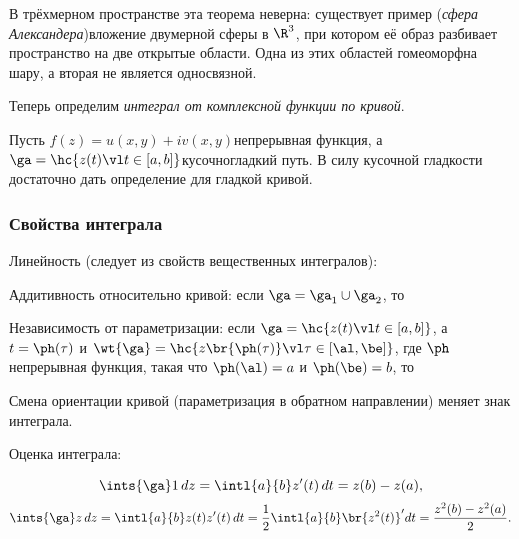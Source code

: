 \documentclass[a4paper]{article}
\begin{document}
\begin{note}
В трёхмерном пространстве эта теорема неверна: существует пример (\emph{сфера Александера})\т вложение
двумерной сферы в $\R^3$, при котором её образ разбивает пространство на две  открытые области. Одна из этих областей
гомеоморфна шару, а вторая не является односвязной.
\end{note}

Теперь определим \emph{интеграл от комплексной функции по кривой}.

\begin{df}
Пусть $f(z)=u(x,y)+iv(x,y)$\т непрерывная функция, а $\ga=\hc{z(t) \vl t \in [a,b]}$\т кусочно\д гладкий путь.
В силу кусочной гладкости достаточно дать определение для гладкой кривой.


\end{df}

\subsubsection{Свойства интеграла}

 Линейность (следует из свойств вещественных интегралов):


 Аддитивность относительно кривой: если $\ga=\ga_1\cup\ga_2$, то


 Независимость от параметризации: если $\ga= \hc{z(t) \vl t \in [a,b]}$, а
$t=\ph(\tau)$ и $\wt{\ga}=\hc{z\br{\ph(\tau)} \vl \tau \in [\al, \be]}$, где $\ph$\т
непрерывная функция, такая что $\ph(\al)=a$ и $\ph(\be)=b$, то 

 Смена ориентации кривой (параметризация в обратном направлении) меняет знак интеграла.

 Оценка  интеграла:


\begin{ex}
$$\ints{\ga}1\,dz=\intl{a}{b}z'(t)\,dt=z(b)-z(a),$$
$$\ints{\ga}z\,dz=\intl{a}{b}z(t)z'(t)\,dt = \frac12\intl{a}{b}\br{z^2(t)}'dt=\frac{z^2(b)-z^2(a)}{2}.$$
\end{ex}
\end{document}
